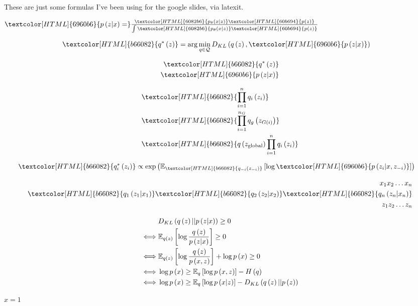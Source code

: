\documentclass{article}
\title{}
\author{Kris Sankaran}
\begin{document}
These are just some formulas I've been using for the google slides, via latexit.

$\textcolor[HTML]{6960b6}{p\left(z\vert x\right) = }\frac{\textcolor[HTML]{6082b6}{p_{\theta}\left(x \vert z\right)}\textcolor[HTML]{60b694}{p\left(z\right)}}{\int \textcolor[HTML]{6082b6}{p_{\theta}\left(x \vert z\right)} \textcolor[HTML]{60b694}{p\left(z\right)}}$


\begin{align*}
  \textcolor[HTML]{b66082}{q^{\ast}\left(z\right)} &= \arg\min_{q \in \mathcal{Q}} D_{KL}\left(q\left(z\right), \textcolor[HTML]{6960b6}{p\left(z \vert x\right)}\right)
\end{align*}

\begin{align*}
   \textcolor[HTML]{b66082}{q^{\ast}\left(z\right)} \\
   \textcolor[HTML]{6960b6}{p\left(z \vert x\right)}
\end{align*}

\begin{align*}
  &\textcolor[HTML]{b66082}{\prod_{i = 1}^{n} q_{i}\left(z_{i}\right)} \\
  &\textcolor[HTML]{b66082}{\prod_{i = 1}^{n_{G}} q_{g}\left(z_{G\left(i\right)}\right)} \\
  &\textcolor[HTML]{b66082}{q\left(z_{\text{global}}\right)\prod_{i = 1}^{n}q_{i}\left(z_{i}\right)}
\end{align*}

\begin{align*}
  \textcolor[HTML]{b66082}{q_{i}^{\ast}\left(z_{i}\right)} &\propto \exp{\Esubarg{\textcolor[HTML]{b66082}{q_{-i}\left(z_{-i}\right)}}{\log \textcolor[HTML]{6960b6}{p\left(z_{i} \vert x, z_{-i}\right)}}}
\end{align*}

\begin{align*}
  x_{1} x_2 \dots x_n \\
  \textcolor[HTML]{b66082}{q_{1}\left(z_{1} \vert x_{1}\right)}  \textcolor[HTML]{b66082}{q_{2}\left(z_{2} \vert x_{2}\right)} \textcolor[HTML]{b66082}{q_{n}\left(z_{n} \vert x_{n}\right)} \\
  z_{1} z_2 \dots z_n \\
\end{align*}

\begin{align*}
  &D_{KL}\left(q\left(z\right) \vert \vert p\left(z \vert x\right)\right) \geq 0 \\
  \iff &\mathbb{E}_{q\left(z\right)}\left[{\log \frac{q\left(z\right)}{p\left(z \vert x\right)}}\right] \geq 0 \\
  \iff &\mathbb{E}_{q\left(z\right)}\left[{\log \frac{q\left(z\right)}{p\left(x, z\right)}}\right] + \log p\left(x\right) \geq 0 \\
  \iff &\log p\left(x\right) \geq \mathbb{E}_{q}\left[{\log p\left(x, z\right)}\right] - H\left(q\right) \\
  \iff &\log p\left(x\right) \geq \mathbb{E}_{q}\left[{\log p\left(x \vert z\right)}\right] - D_{KL}\left(q\left(z\right) \vert \vert p\left(z\right)\right)
\end{align*}


$x= 1$
\end{document}
